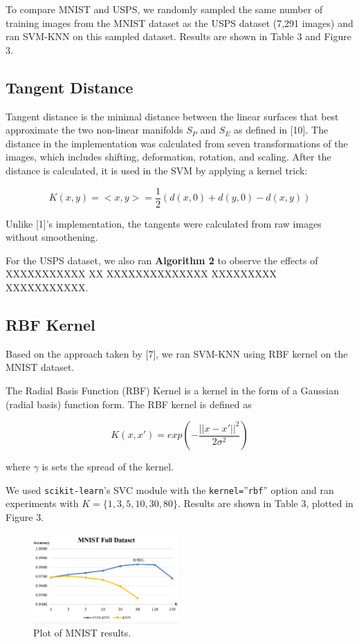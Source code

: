 \documentclass[11pt,letterpaper]{article}
\begin{document}
To compare MNIST and USPS, we randomly sampled the same number of training images from the MNIST dataset as the USPS dataset (7,291 images) and ran SVM-KNN on this sampled dataset. Results are shown in Table 3 and Figure 3.

\subsection{Tangent Distance}

Tangent distance is the minimal distance between the linear surfaces that best approximate the two non-linear manifolds $S_P$ and $S_E$ as defined in [10]. The distance in the implementation was calculated from seven transformations of the images, which includes shifting, deformation, rotation, and scaling. After the distance is calculated, it is used in the SVM by applying a kernel trick:

$$K(x,y)=<x,y>=\frac{1}{2}(d(x,0)+d(y,0)-d(x,y))$$

Unlike [1]'s implementation, the tangents were calculated from raw images without smoothening.


For the USPS dataset, we also ran \textbf{Algorithm 2} to observe the effects of XXXXXXXXXXX XX XXXXXXXXXXXXXX XXXXXXXXX XXXXXXXXXXX.

\subsection{RBF Kernel}

Based on the approach taken by [7], we ran SVM-KNN using RBF kernel on the MNIST dataset.

The Radial Basis Function (RBF) Kernel is a kernel in the form of a Gaussian (radial basis) function form. The RBF kernel is defined as 

$$K(x, x') = exp\left(-\frac{||x-x'||^2}{2\sigma^2}\right)$$

where $\gamma$ is sets the spread of the kernel.

We used {\tt scikit-learn}'s SVC module with the {\tt kernel=}''{\tt rbf}'' option and ran experiments with $K=\{1,3,5,10,30,80\}$. Results are shown in Table 3, plotted in Figure 3.

\begin{figure}[t!]
  \centering
  \includegraphics[keepaspectratio, width=0.5\textwidth]{mnist_full.png}
  \caption{Plot of MNIST results.}
\end{figure}
\end{document}
